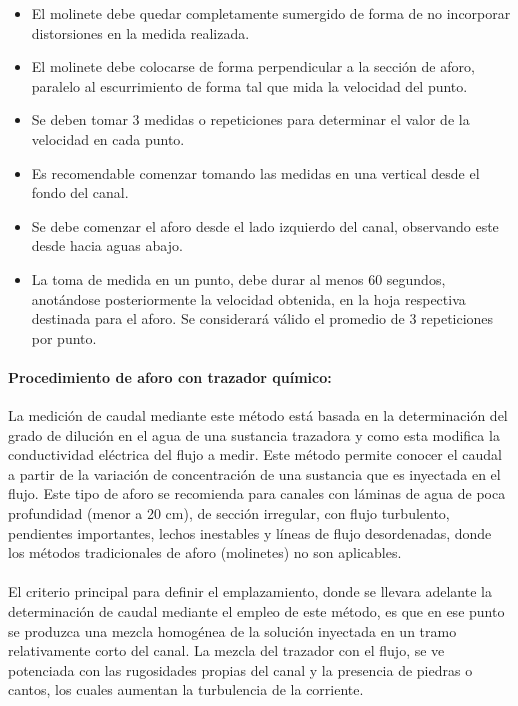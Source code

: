 \documentclass[]{article}
\providecommand{\tightlist}{%
  \setlength{\itemsep}{0pt}\setlength{\parskip}{0pt}}
\begin{document}
\begin{itemize}
\tightlist
\item El molinete debe quedar completamente sumergido de forma de no incorporar distorsiones en la medida realizada.
\item El molinete debe colocarse de forma perpendicular a la sección de aforo, paralelo al escurrimiento de forma tal que mida la velocidad del punto.
\item Se deben tomar 3 medidas o repeticiones para determinar el valor de la velocidad en cada punto.
\item Es recomendable comenzar tomando las medidas en una vertical desde el fondo del canal.
\item Se debe comenzar el aforo desde el lado izquierdo del canal, observando este desde hacia aguas abajo.
\item La toma de medida en un punto, debe durar al menos 60 segundos, anotándose posteriormente la velocidad obtenida, en la hoja respectiva destinada para el aforo. Se considerará válido el promedio de 3 repeticiones por punto.
\end{itemize}

\paragraph{Procedimiento de aforo con trazador químico:}

La medición de caudal mediante este método está basada en la determinación del grado de dilución en el agua de una sustancia trazadora y como esta modifica la conductividad eléctrica del flujo a medir. Este método permite conocer el caudal a partir de la variación de concentración de una sustancia que es inyectada en el flujo. Este tipo de aforo se recomienda para canales con láminas de agua de poca profundidad (menor a 20 cm), de sección irregular, con flujo turbulento, pendientes importantes, lechos inestables y líneas de flujo desordenadas, donde los métodos tradicionales de aforo (molinetes) no son aplicables.\\
\\
El criterio principal para definir el emplazamiento, donde se llevara adelante la determinación de caudal mediante el empleo de este método, es que en ese punto se produzca una mezcla homogénea de la solución inyectada en un tramo relativamente corto del canal. La mezcla del trazador con el flujo, se ve potenciada con las rugosidades propias del canal y la presencia de piedras o cantos, los cuales aumentan la turbulencia de la corriente.
\end{document}
